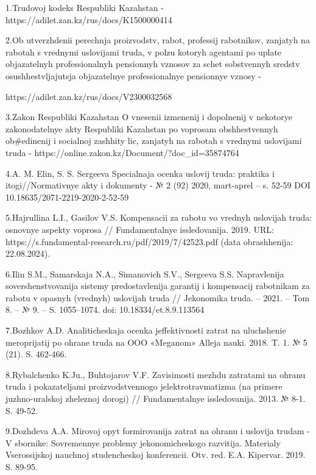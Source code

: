 \begin{noparindent}
1.Trudovoj kodeks Respubliki Kazahstan -
https://adilet.zan.kz/rus/docs/K1500000414

2.Ob utverzhdenii perechnja proizvodstv, rabot, professij rabotnikov,
zanjatyh na rabotah s vrednymi uslovijami truda, v
pol\textquotesingle zu kotoryh agentami po uplate
objazatel\textquotesingle nyh professional\textquotesingle nyh
pensionnyh vznosov za schet sobstvennyh sredstv osushhestvljajutsja
objazatel\textquotesingle nye professional\textquotesingle nye
pensionnye vznosy -

https://adilet.zan.kz/rus/docs/V2300032568

3.Zakon Respubliki Kazahstan O vnesenii izmenenij i dopolnenij v
nekotorye zakonodatel\textquotesingle nye akty Respubliki Kazahstan po
voprosam obshhestvennyh ob\#edinenij i social\textquotesingle noj
zashhity lic, zanjatyh na rabotah s vrednymi uslovijami truda -
https://online.zakon.kz/Document/?doc\_id=35874764

4.A. M. Elin, S. S. Sergeeva Special\textquotesingle naja ocenka uslovij
truda: praktika i itogi//Normativnye akty i dokumenty - № 2 (92) 2020,
mart-aprel\textquotesingle{} -- s. 52-59 DOI
10.18635/2071-2219-2020-2-52-59

5.Hajrullina L.I., Gasilov V.S. Kompensacii za rabotu vo vrednyh
uslovijah truda: osnovnye aspekty voprosa //
Fundamental\textquotesingle nye issledovanija. 2019. URL:
https://s.fundamental-research.ru/pdf/2019/7/42523.pdf (data
obrashhenija: 22.08.2024).

6.Il\textquotesingle in S.M., Samarskaja N.A., Simanovich S.V., Sergeeva
S.S. Napravlenija sovershenstvovanija sistemy predostavlenija garantij i
kompensacij rabotnikam za rabotu v opasnyh (vrednyh) uslovijah truda //
Jekonomika truda. -- 2021. -- Tom 8. -- № 9. -- S. 1055--1074. doi:
10.18334/et.8.9.113564

7.Bozhkov A.D. Analiticheskaja ocenka jeffektivnosti zatrat na
uluchshenie meroprijatij po ohrane truda na OOO «Meganom» Alleja nauki.
2018. T. 1. № 5 (21). S. 462-466.

8.Rybalchenko K.Ju., Buhtojarov V.F. Zavisimosti mezhdu zatratami na
ohranu truda i pokazateljami proizvodstvennogo jelektrotravmatizma (na
primere juzhno-ural\textquotesingle skoj zheleznoj dorogi) //
Fundamental\textquotesingle nye issledovanija. 2013. № 8-1. S. 49-52.

9.Dozhdeva A.A. Mirovoj opyt formirovanija zatrat na ohranu i uslovija
trudam - V sbornike: Sovremennye problemy jekonomicheskogo razvitija.
Materialy Vserossijskoj nauchnoj studencheskoj konferencii. Otv. red.
E.A. Kipervar. 2019. S. 89-95.


\end{noparindent}

